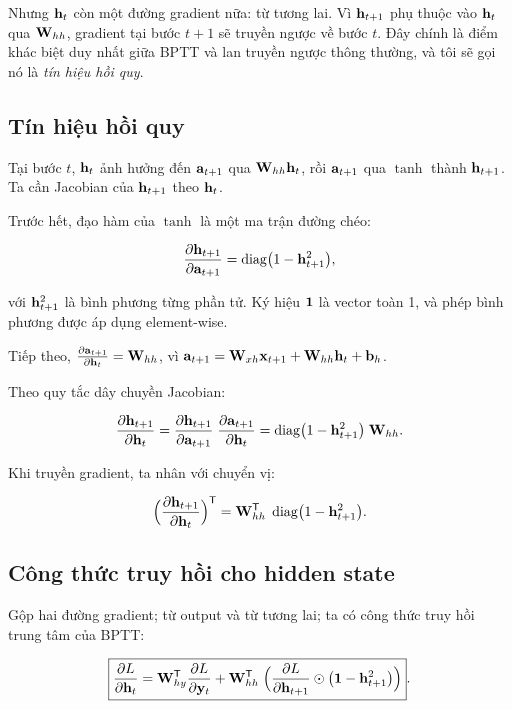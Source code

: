 Nhưng $\mathbf{h}_t$ còn một đường gradient nữa: từ tương lai. Vì
$\mathbf{h}_{t+1}$ phụ thuộc vào $\mathbf{h}_t$ qua $\mathbf{W}_{hh}$, gradient
tại bước $t+1$ sẽ truyền ngược về bước $t$. Đây chính là điểm khác biệt duy
nhất giữa BPTT và lan truyền ngược thông thường, và tôi sẽ gọi nó là
\emph{tín hiệu hồi quy}.

\subsection{Tín hiệu hồi quy}

Tại bước $t$, $\mathbf{h}_t$ ảnh hưởng đến $\mathbf{a}_{t+1}$ qua
$\mathbf{W}_{hh} \mathbf{h}_t$, rồi $\mathbf{a}_{t+1}$ qua $\tanh$ thành
$\mathbf{h}_{t+1}$. Ta cần Jacobian của $\mathbf{h}_{t+1}$ theo $\mathbf{h}_t$.

Trước hết, đạo hàm của $\tanh$ là một ma trận đường chéo:

\[
  \frac{\partial \mathbf{h}_{t+1}}{\partial \mathbf{a}_{t+1}}
  = \operatorname{diag}\bigl(1 - \mathbf{h}_{t+1}^2\bigr),
\]

với $\mathbf{h}_{t+1}^2$ là bình phương từng phần tử. Ký hiệu $\mathbf{1}$ là
vector toàn 1, và phép bình phương được áp dụng element-wise.

Tiếp theo, $\frac{\partial \mathbf{a}_{t+1}}{\partial \mathbf{h}_t} = \mathbf{W}_{hh}$, vì
$\mathbf{a}_{t+1} = \mathbf{W}_{xh} \mathbf{x}_{t+1} + \mathbf{W}_{hh} \mathbf{h}_t
+ \mathbf{b}_h$.

Theo quy tắc dây chuyền Jacobian:

\begin{equation}
  \frac{\partial \mathbf{h}_{t+1}}{\partial \mathbf{h}_t}
  = \frac{\partial \mathbf{h}_{t+1}}{\partial \mathbf{a}_{t+1}}
    \;\frac{\partial \mathbf{a}_{t+1}}{\partial \mathbf{h}_t}
  = \operatorname{diag}\bigl(1 - \mathbf{h}_{t+1}^2\bigr) \; \mathbf{W}_{hh}.
  \label{eq:bptt-dhnext-dht}
\end{equation}

Khi truyền gradient, ta nhân với chuyển vị:

\[
  \Bigl(\frac{\partial \mathbf{h}_{t+1}}{\partial \mathbf{h}_t}\Bigr)^{\mathsf{T}}
  = \mathbf{W}_{hh}^{\mathsf{T}} \;
    \operatorname{diag}\bigl(1 - \mathbf{h}_{t+1}^2\bigr).
\]

\subsection{Công thức truy hồi cho hidden state}

Gộp hai đường gradient; từ output và từ tương lai; ta có công thức truy hồi
trung tâm của BPTT:

\begin{equation}
  \boxed{
    \frac{\partial L}{\partial \mathbf{h}_t}
    = \mathbf{W}_{hy}^{\mathsf{T}} \frac{\partial L}{\partial \mathbf{y}_t}
    + \mathbf{W}_{hh}^{\mathsf{T}} \;
      \Bigl(
        \frac{\partial L}{\partial \mathbf{h}_{t+1}}
        \odot \bigl(\mathbf{1} - \mathbf{h}_{t+1}^2\bigr)
      \Bigr)
  }.
  \label{eq:bptt-dh-recurrence}
\end{equation}

